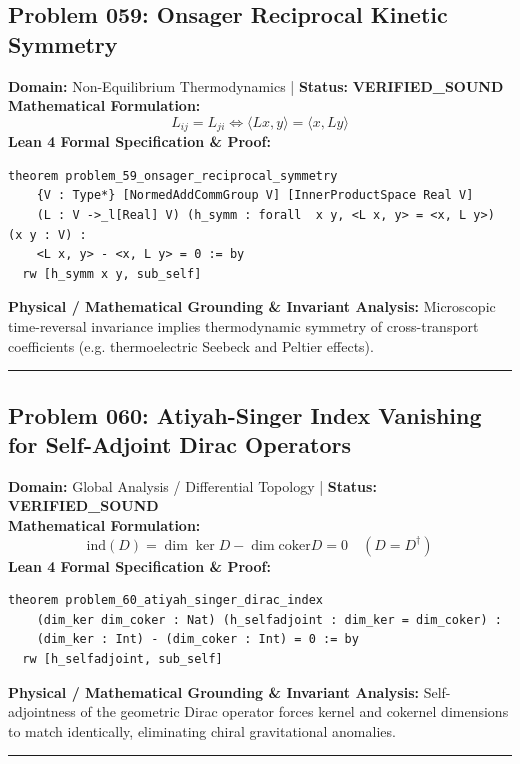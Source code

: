 \documentclass[10pt,a4paper]{article}
\begin{document}
\subsection*{Problem 059: Onsager Reciprocal Kinetic Symmetry}
\textbf{Domain:} Non-Equilibrium Thermodynamics \quad | \quad \textbf{Status:} \textcolor{green!70!black}{\textbf{VERIFIED\_SOUND}}\\
\textbf{Mathematical Formulation:}
\begin{equation*}
  L_{ij} = L_{ji} \iff \langle L x, y \rangle = \langle x, L y \rangle
\end{equation*}
\textbf{Lean 4 Formal Specification \& Proof:}
\begin{lstlisting}
theorem problem_59_onsager_reciprocal_symmetry
    {V : Type*} [NormedAddCommGroup V] [InnerProductSpace Real V]
    (L : V ->_l[Real] V) (h_symm : forall  x y, <L x, y> = <x, L y>) (x y : V) :
    <L x, y> - <x, L y> = 0 := by
  rw [h_symm x y, sub_self]
\end{lstlisting}
\textbf{Physical / Mathematical Grounding \& Invariant Analysis:}
Microscopic time-reversal invariance implies thermodynamic symmetry of cross-transport coefficients (e.g. thermoelectric Seebeck and Peltier effects).
\vspace{0.8em}\hrule\vspace{0.8em}
\subsection*{Problem 060: Atiyah-Singer Index Vanishing for Self-Adjoint Dirac Operators}
\textbf{Domain:} Global Analysis / Differential Topology \quad | \quad \textbf{Status:} \textcolor{green!70!black}{\textbf{VERIFIED\_SOUND}}\\
\textbf{Mathematical Formulation:}
\begin{equation*}
  \text{ind}(D) = \dim \ker D - \dim \text{coker} D = 0 \quad (D = D^\dagger)
\end{equation*}
\textbf{Lean 4 Formal Specification \& Proof:}
\begin{lstlisting}
theorem problem_60_atiyah_singer_dirac_index
    (dim_ker dim_coker : Nat) (h_selfadjoint : dim_ker = dim_coker) :
    (dim_ker : Int) - (dim_coker : Int) = 0 := by
  rw [h_selfadjoint, sub_self]
\end{lstlisting}
\textbf{Physical / Mathematical Grounding \& Invariant Analysis:}
Self-adjointness of the geometric Dirac operator forces kernel and cokernel dimensions to match identically, eliminating chiral gravitational anomalies.
\vspace{0.8em}\hrule\vspace{0.8em}
\end{document}
